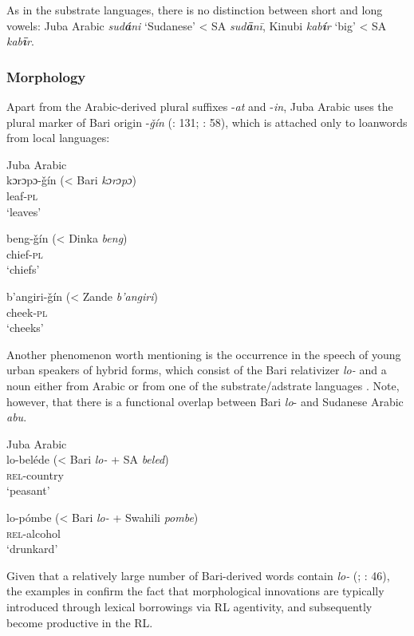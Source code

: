 \documentclass[output=paper]{langsci/langscibook}
\begin{document}
As in the substrate languages, there is no distinction between short and long vowels: Juba Arabic \textit{sud\textbf{á}ni} ‘Sudanese’ < SA \textit{sud\textbf{ā}nī}, Kinubi \textit{kab\textbf{í}r} ‘big’ < SA \textit{kab\textbf{ī}r}.


 \subsubsection{Morphology}

Apart from the Arabic-derived plural suffixes -\textit{at} and -\textit{in}, Juba Arabic uses the plural marker of Bari origin -\textit{ǧín} (\citealt{Nakao2012}: 131; \citealt{Manfredi2014plural}: 58), which is attached only to loanwords from local languages:


\ea
{Juba Arabic \citep[58]{Manfredi2014plural}}\\
\ea
\gll kɔrɔpɔ-ǧín (\textup{< Bari} \textit{kɔrɔpɔ})\\
    leaf-\textsc{pl}\\
\glt       `leaves' 

\ex
\gll beng-ǧín (< Dinka \textit{beng}) \\
         chief-\textsc{pl}\\
\glt       `chiefs'


\ex
\gll  b'angiri-ǧín (< \textup{Zande} \textit{b'angiri}) \\
         cheek\textsc{-pl}\\
\glt       `cheeks' 
\z
\z

Another phenomenon worth mentioning is the occurrence in the speech of young urban speakers of hybrid forms, which consist of the Bari relativizer \textit{lo-} and a noun either from Arabic or from one of the substrate/adstrate languages \citep[131]{Nakao2012}. Note, however, that there is a functional overlap between Bari \textit{lo}- and Sudanese Arabic \textit{abu}.

\ea\label{lo}
{Juba Arabic \citep[46]{Manfredi2017}}\\
\ea\gll lo-beléde (\textup{< Bari} \textit{lo-} \textup{+ SA} \textit{beled})\\
\textsc{rel}-country\\
\glt       `peasant'

\ex
\gll lo-pómbe (< Bari \textit{lo-} + \textup{Swahili} \textit{pombe})\\
 \textsc{rel}-alcohol\\
\glt    `drunkard'
\z
\z

Given that a relatively large number of Bari-derived words contain \textit{lo-} (\citealt{Miller1989}; \citealt{Manfredi2017}: 46), the examples in  confirm the fact that morphological innovations are typically introduced through lexical borrowings via RL agentivity, and subsequently become productive in the RL. 
\end{document}
